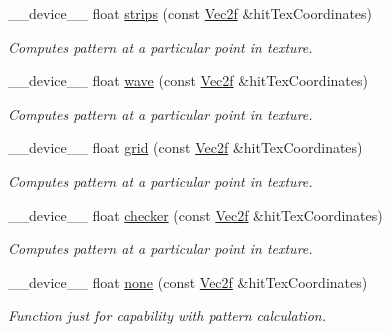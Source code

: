 \begin{DoxyCompactItemize}
\+\_\+\+\_\+device\+\_\+\+\_\+ float \hyperlink{group__intersection__test__prperties_gae0b690ff7b5f9b93e53bb0c1437fbf55}{strips} (const \hyperlink{class_vec2}{Vec2f} \&hit\+Tex\+Coordinates)
\begin{DoxyCompactList}\small\item\em Computes pattern at a particular point in texture. \end{DoxyCompactList}\item 
\+\_\+\+\_\+device\+\_\+\+\_\+ float \hyperlink{group__intersection__test__prperties_gaff97add1678535636b1f4f1ca3f7a96c}{wave} (const \hyperlink{class_vec2}{Vec2f} \&hit\+Tex\+Coordinates)
\begin{DoxyCompactList}\small\item\em Computes pattern at a particular point in texture. \end{DoxyCompactList}\item 
\+\_\+\+\_\+device\+\_\+\+\_\+ float \hyperlink{group__intersection__test__prperties_ga4db329f1c6b211cd0ac9e6dc297f279e}{grid} (const \hyperlink{class_vec2}{Vec2f} \&hit\+Tex\+Coordinates)
\begin{DoxyCompactList}\small\item\em Computes pattern at a particular point in texture. \end{DoxyCompactList}\item 
\+\_\+\+\_\+device\+\_\+\+\_\+ float \hyperlink{group__intersection__test__prperties_ga100df37360dfe6954f51431bc6343dc6}{checker} (const \hyperlink{class_vec2}{Vec2f} \&hit\+Tex\+Coordinates)
\begin{DoxyCompactList}\small\item\em Computes pattern at a particular point in texture. \end{DoxyCompactList}\item 
\+\_\+\+\_\+device\+\_\+\+\_\+ float \hyperlink{group__intersection__test__prperties_ga6ea9f9e6624268a263962a17c6634feb}{none} (const \hyperlink{class_vec2}{Vec2f} \&hit\+Tex\+Coordinates)
\begin{DoxyCompactList}\small\item\em Function just for capability with pattern calculation. \end{DoxyCompactList}\end{DoxyCompactItemize}

